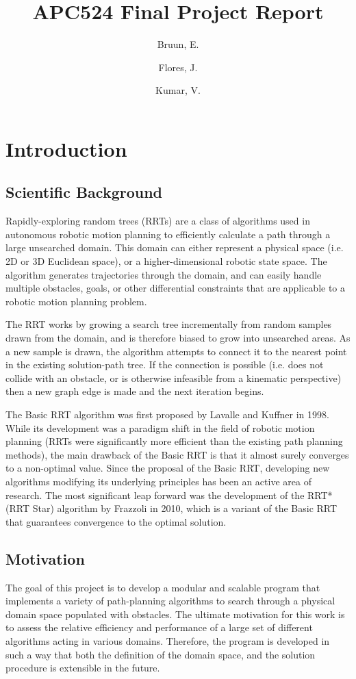 \documentclass[10pt]{article}
\title{APC524 Final Project Report}
\author{Bruun, E. \and Flores, J. \and Kumar, V.}
\begin{document}
\maketitle

\section{Introduction}
\label{sec:intro}
	\subsection{Scientific Background}
		Rapidly-exploring random trees (RRTs) are a class of algorithms used in autonomous robotic motion planning to efficiently calculate a path through a large unsearched domain. This domain can either represent a physical space (i.e. 2D or 3D Euclidean space), or a higher-dimensional robotic state space. The algorithm generates trajectories through the domain, and can easily handle multiple obstacles, goals, or other differential constraints that are applicable to a robotic motion planning problem.
		
		The RRT works by growing a search tree incrementally from random samples drawn from the domain, and is therefore biased to grow into unsearched areas. As a new sample is drawn, the algorithm attempts to connect it to the nearest point in the existing solution-path tree. If the connection is possible (i.e. does not collide with an obstacle, or is otherwise infeasible from a kinematic perspective) then a new graph edge is made and the next iteration begins.
		
		The Basic RRT algorithm was first proposed by Lavalle and Kuffner in 1998. While its development was a paradigm shift in the field of robotic motion planning (RRTs were significantly more efficient than the existing path planning methods), the main drawback of the Basic RRT is that it almost surely converges to a non-optimal value. Since the proposal of the Basic RRT, developing new algorithms modifying its underlying principles has been an active area of research. The most significant leap forward was the development of the RRT* (RRT Star) algorithm by Frazzoli in 2010, which is a variant of the Basic RRT that guarantees convergence to the optimal solution.

	\subsection{Motivation}
		The goal of this project is to develop a modular and scalable program that implements a variety of path-planning algorithms to search through a physical domain space populated with obstacles. The ultimate motivation for this work is to assess the relative efficiency and performance of a large set of different algorithms acting in various domains. Therefore, the program is developed in such a way that both the definition of the domain space, and the solution procedure is extensible in the future. 
\end{document}
